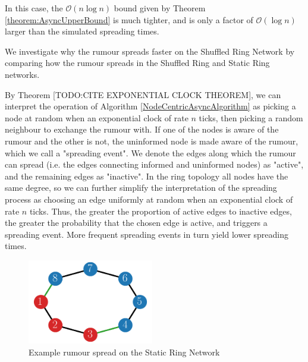 In this case, the $\mathcal{O}(n \log n)$ bound given by Theorem \ref{theorem:AsyncUpperBound} is much tighter, and is only a factor of $\mathcal{O}(\log n)$ larger than the simulated spreading times.

We investigate why the rumour spreads faster on the Shuffled Ring Network by comparing how the rumour spreads in the Shuffled Ring and Static Ring networks. %

By Theorem [TODO:CITE EXPONENTIAL CLOCK THEOREM], we can interpret the operation of Algorithm \ref{NodeCentricAsyncAlgorithm} as picking a node at random when an exponential clock of rate $n$ ticks, %
then picking a random neighbour to exchange the rumour with. If one of the nodes is aware of the rumour and the other is not, the uninformed node is made aware of the rumour, which we call a "spreading event". We denote the edges along which the rumour can spread (i.e. the edges connecting informed and uninformed nodes) as "active", and the remaining edges as "inactive".
In the ring topology all nodes have the same degree, so we can further simplify the interpretation of the spreading process as choosing an edge uniformly at random when an exponential clock of rate $n$ ticks. Thus, the greater the proportion of active edges to inactive edges, the greater the probability that the chosen edge is active, and triggers a spreading event. More frequent spreading events in turn yield lower spreading times. 


\begin{figure}[h]
	\centering
	\includegraphics[width=0.49\textwidth]{./figures/static_ring_example_spread.png}
	\caption{Example rumour spread on the Static Ring Network}
	\label{fig:staticRingExampleSpread}
\end{figure}

